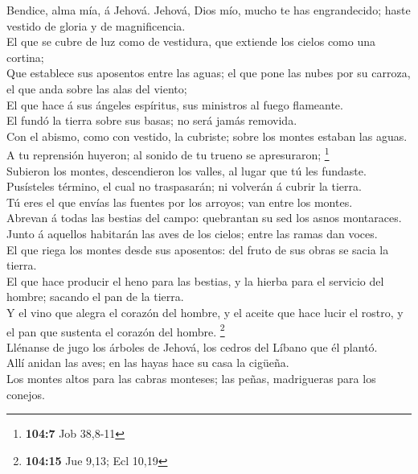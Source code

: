  Bendice, alma mía, á Jehová. Jehová, Dios mío, mucho te
has engrandecido; haste vestido de gloria y de magnificencia.\\
 El que se cubre de luz como de vestidura, que extiende
los cielos como una cortina;\\
 Que establece sus aposentos entre las aguas; el que pone
las nubes por su carroza, el que anda sobre las alas del viento;\\
 El que hace á sus ángeles espíritus, sus ministros al
fuego flameante.\\
 El fundó la tierra sobre sus basas; no será jamás
removida.\\
 Con el abismo, como con vestido, la cubriste; sobre los
montes estaban las aguas.\\
 A tu reprensión huyeron; al sonido de tu trueno se
apresuraron; \footnote{\textbf{104:7} Job 38,8-11}\\
 Subieron los montes, descendieron los valles, al lugar
que tú les fundaste.\\
 Pusísteles término, el cual no traspasarán; ni volverán á
cubrir la tierra.\\
 Tú eres el que envías las fuentes por los arroyos; van
entre los montes.\\
 Abrevan á todas las bestias del campo: quebrantan su sed
los asnos montaraces.\\
 Junto á aquellos habitarán las aves de los cielos; entre
las ramas dan voces.\\
 El que riega los montes desde sus aposentos: del fruto
de sus obras se sacia la tierra.\\
 El que hace producir el heno para las bestias, y la
hierba para el servicio del hombre; sacando el pan de la tierra.\\
 Y el vino que alegra el corazón del hombre, y el aceite
que hace lucir el rostro, y el pan que sustenta el corazón del hombre.
\footnote{\textbf{104:15} Jue 9,13; Ecl 10,19}\\
 Llénanse de jugo los árboles de Jehová, los cedros del
Líbano que él plantó.\\
 Allí anidan las aves; en las hayas hace su casa la
cigüeña.\\
 Los montes altos para las cabras monteses; las peñas,
madrigueras para los conejos.\\
